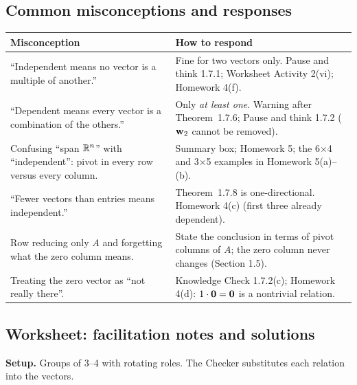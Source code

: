 \documentclass[11pt]{article}
\begin{document}
\subsection*{Common misconceptions and responses}
\begin{center}\small
\begin{tabular}{p{2.25in}p{3.6in}}\toprule
\textbf{Misconception} & \textbf{How to respond}\\\midrule
``Independent means no vector is a multiple of another.'' & Fine for two vectors only. Pause and think 1.7.1; Worksheet Activity 2(vi); Homework 4(f).\\
``Dependent means every vector is a combination of the others.'' & Only \emph{at least one}. Warning after Theorem~1.7.6; Pause and think 1.7.2 ($\mathbf{w}_2$ cannot be removed).\\
Confusing ``span $\mathbb{R}^n$'' with ``independent'': pivot in every row versus every column. & Summary box; Homework 5; the 6$\times$4 and 3$\times$5 examples in Homework 5(a)--(b).\\
``Fewer vectors than entries means independent.'' & Theorem~1.7.8 is one-directional. Homework 4(c) (first three already dependent).\\
Row reducing only $A$ and forgetting what the zero column means. & State the conclusion in terms of pivot columns of $A$; the zero column never changes (Section 1.5).\\
Treating the zero vector as ``not really there''. & Knowledge Check 1.7.2(c); Homework 4(d): $1\cdot\mathbf{0}=\mathbf{0}$ is a nontrivial relation.\\\bottomrule
\end{tabular}
\end{center}

\subsection*{Worksheet: facilitation notes and solutions}
\textbf{Setup.} Groups of 3--4 with rotating roles. The Checker substitutes each relation into the vectors.
\end{document}
